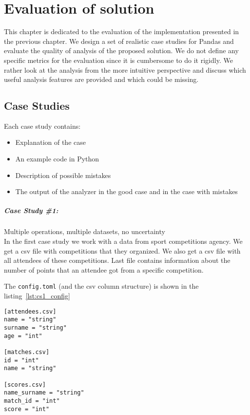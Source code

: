 \chapter{Evaluation of solution}\label{ch:evaluation-of-solution}

This chapter is dedicated to the evaluation of the implementation presented in the previous chapter.
We design a set of realistic case studies for Pandas and evaluate the quality of analysis of the proposed solution.
We do not define any specific metrics for the evaluation since it is cumbersome to do it rigidly.
We rather look at the analysis from the more intuitive perspective and discuss which useful analysis features are
provided and which could be missing.

\section{Case Studies}

Each case study contains:
\begin{itemize}
    \item Explanation of the case
    \item An example code in Python
    \item Description of possible mistakes
    \item The output of the analyzer in the good case and in the case with mistakes
\end{itemize}

\paragraph{Case Study \#1:} Multiple operations, multiple datasets, no uncertainty  \\

In the first case study we work with a data from sport competitions agency.
We get a csv file with competitions that they organized.
We also get a csv file with all attendees of these competitions.
Last file contains information about the number of points that an attendee got from a specific competition.

The \verb|config.toml| (and the csv column structure) is shown in the listing~\ref{lst:cs1_config}

\begin{lstlisting}[caption=config.toml of the first case study, label={lst:cs1_config}, captionpos=b]
[attendees.csv]
name = "string"
surname = "string"
age = "int"

[matches.csv]
id = "int"
name = "string"

[scores.csv]
name_surname = "string"
match_id = "int"
score = "int"
\end{lstlisting}

